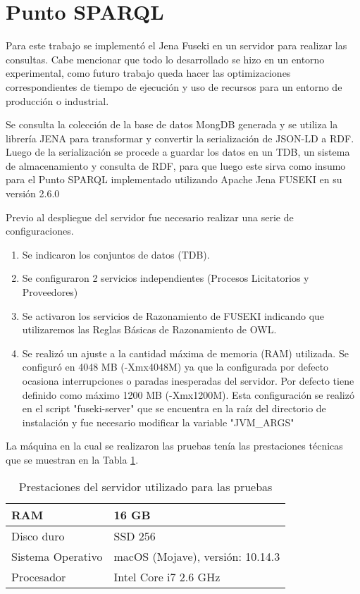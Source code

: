 \section{Punto SPARQL}
\label{sec:puntosparql}

Para este trabajo se implementó el Jena Fuseki\cite{ApacheJe97:online} en un servidor para realizar las consultas. Cabe mencionar que todo lo desarrollado se hizo en un entorno experimental, como futuro trabajo queda hacer las optimizaciones correspondientes de tiempo de ejecución y uso de recursos para un entorno de producción o industrial.

Se consulta la colección de la base de datos MongDB generada y se utiliza la librería JENA para transformar y convertir la serialización de JSON-LD a RDF. Luego de la serialización se procede a guardar los datos en un TDB, un sistema de almacenamiento y consulta de RDF, para que luego este sirva como insumo para el Punto SPARQL implementado utilizando Apache Jena FUSEKI en su versión 2.6.0

Previo al despliegue del servidor fue necesario realizar una serie de configuraciones.

\begin{enumerate}
    \item Se indicaron los conjuntos de datos (TDB).
    \item Se configuraron 2 servicios independientes (Procesos Licitatorios y Proveedores)
    \item Se activaron los servicios de Razonamiento de FUSEKI indicando que utilizaremos las Reglas Básicas de Razonamiento de OWL. 
    \item Se realizó un ajuste a la cantidad máxima de memoria (RAM) utilizada. Se configuró en 4048 MB (-Xmx4048M) ya que la configurada por defecto ocasiona interrupciones o paradas inesperadas del servidor. Por defecto tiene definido como máximo 1200 MB (-Xmx1200M). Esta configuración se realizó en el script "fuseki-server" que se encuentra en la raíz del directorio de instalación y fue necesario modificar la variable "JVM\_ARGS"

\end{enumerate}

La máquina en la cual se realizaron las pruebas tenía las prestaciones técnicas que se muestran en la Tabla \ref{tab:prestaciones_servidor}.


\begin{table}[!htb]
\centering
    \caption{Prestaciones del servidor utilizado para las pruebas}
    \label{tab:prestaciones_servidor}
\begin{tabular}{|l|l|}
\hline
 RAM & 16 GB\\\hline
    Disco duro & SSD 256\\\hline
    Sistema Operativo & macOS (Mojave), versión: 10.14.3\\\hline
    Procesador & Intel Core i7 2.6 GHz\\\hline
\end{tabular}
\end{table}


